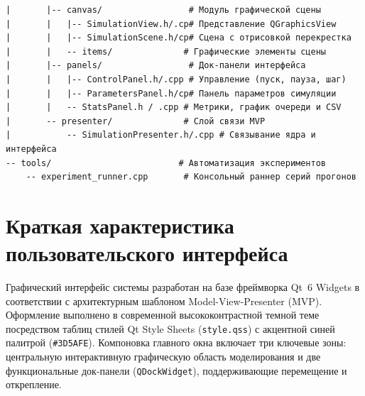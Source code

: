 \documentclass[11pt, a4paper]{article}
\begin{document}
{\begin{verbatim}
|       |-- canvas/                 # Модуль графической сцены
|       |   |-- SimulationView.h/.cp# Представление QGraphicsView
|       |   |-- SimulationScene.h/cp# Сцена с отрисовкой перекрестка
|       |   -- items/              # Графические элементы сцены
|       |-- panels/                 # Док-панели интерфейса
|       |   |-- ControlPanel.h/.cpp # Управление (пуск, пауза, шаг)
|       |   |-- ParametersPanel.h/cp# Панель параметров симуляции
|       |   -- StatsPanel.h / .cpp # Метрики, график очереди и CSV
|       -- presenter/              # Слой связи MVP
|           -- SimulationPresenter.h/.cpp # Связывание ядра и интерфейса
-- tools/                         # Автоматизация экспериментов
    -- experiment_runner.cpp       # Консольный раннер серий прогонов
\end{verbatim}
}

\section{Краткая характеристика пользовательского интерфейса}
Графический интерфейс системы разработан на базе фреймворка Qt~6 Widgets в соответствии с архитектурным шаблоном Model-View-Presenter (MVP). Оформление выполнено в современной высококонтрастной темной теме посредством таблиц стилей Qt Style Sheets (\texttt{style.qss}) с акцентной синей палитрой (\texttt{\#3D5AFE}).
Компоновка главного окна включает три ключевые зоны: центральную интерактивную графическую область моделирования и две функциональные док-панели (\texttt{QDockWidget}), поддерживающие перемещение и открепление.
\end{document}
